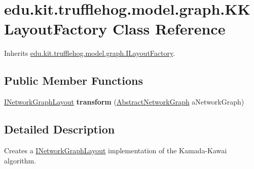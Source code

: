 \hypertarget{classedu_1_1kit_1_1trufflehog_1_1model_1_1graph_1_1_k_k_layout_factory}{}\section{edu.\+kit.\+trufflehog.\+model.\+graph.\+K\+K\+Layout\+Factory Class Reference}
\label{classedu_1_1kit_1_1trufflehog_1_1model_1_1graph_1_1_k_k_layout_factory}


Inherits \hyperlink{interfaceedu_1_1kit_1_1trufflehog_1_1model_1_1graph_1_1_i_layout_factory}{edu.\+kit.\+trufflehog.\+model.\+graph.\+I\+Layout\+Factory}.

\subsection*{Public Member Functions}
\begin{DoxyCompactItemize}
\item 
\hypertarget{classedu_1_1kit_1_1trufflehog_1_1model_1_1graph_1_1_k_k_layout_factory_ab6b9624fb34b06effbc07d172596c4ab}{}\hyperlink{interfaceedu_1_1kit_1_1trufflehog_1_1model_1_1graph_1_1_i_network_graph_layout}{I\+Network\+Graph\+Layout} {\bfseries transform} (\hyperlink{classedu_1_1kit_1_1trufflehog_1_1model_1_1graph_1_1_abstract_network_graph}{Abstract\+Network\+Graph} a\+Network\+Graph)\label{classedu_1_1kit_1_1trufflehog_1_1model_1_1graph_1_1_k_k_layout_factory_ab6b9624fb34b06effbc07d172596c4ab}

\end{DoxyCompactItemize}


\subsection{Detailed Description}
Creates a \hyperlink{interfaceedu_1_1kit_1_1trufflehog_1_1model_1_1graph_1_1_i_network_graph_layout}{I\+Network\+Graph\+Layout} implementation of the Kamada-\/\+Kawai algorithm. 